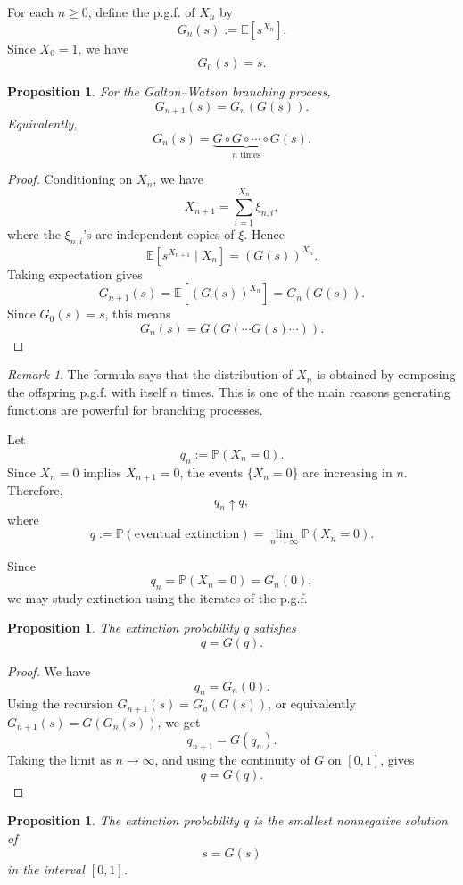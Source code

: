 \documentclass[11pt]{article}
\theoremstyle{plain}
\newtheorem{proposition}[theorem]{Proposition}
\theoremstyle{definition}
\theoremstyle{remark}
\newtheorem{remark}[theorem]{Remark}
\begin{document}
	For each \(n\ge 0\), define the p.g.f. of \(X_n\) by
	\[
	G_n(s)
	:=
	\mathbb{E}[s^{X_n}].
	\]
	Since \(X_0=1\), we have
	\[
	G_0(s)=s.
	\]
	
	\begin{proposition}
		For the Galton--Watson branching process,
		\[
		G_{n+1}(s)
		=
		G_n(G(s)).
		\]
		Equivalently,
		\[
		G_n(s)
		=
		\underbrace{G\circ G\circ\cdots\circ G}_{n\text{ times}}(s).
		\]
	\end{proposition}
	
	\begin{proof}
		Conditioning on \(X_n\), we have
		\[
		X_{n+1}
		=
		\sum_{i=1}^{X_n}\xi_{n,i},
		\]
		where the \(\xi_{n,i}\)'s are independent copies of \(\xi\). Hence
		\[
		\mathbb{E}[s^{X_{n+1}}\mid X_n]
		=
		(G(s))^{X_n}.
		\]
		Taking expectation gives
		\[
		G_{n+1}(s)
		=
		\mathbb{E}[(G(s))^{X_n}]
		=
		G_n(G(s)).
		\]
		Since \(G_0(s)=s\), this means
		\[
		G_n(s)
		=
		G(G(\cdots G(s)\cdots)).
		\]
	\end{proof}
	
	\begin{remark}
		The formula says that the distribution of \(X_n\) is obtained by composing the offspring p.g.f. with itself \(n\) times. This is one of the main reasons generating functions are powerful for branching processes.
	\end{remark}
	
	
	Let
	\[
	q_n:=\mathbb{P}(X_n=0).
	\]
	Since \(X_n=0\) implies \(X_{n+1}=0\), the events \(\{X_n=0\}\) are increasing in \(n\). Therefore,
	\[
	q_n\uparrow q,
	\]
	where
	\[
	q
	:=
	\mathbb{P}(\text{eventual extinction})
	=
	\lim_{n\to\infty}\mathbb{P}(X_n=0).
	\]
	
	Since
	\[
	q_n=\mathbb{P}(X_n=0)=G_n(0),
	\]
	we may study extinction using the iterates of the p.g.f.
	
	\begin{proposition}
		The extinction probability \(q\) satisfies
		\[
		q=G(q).
		\]
	\end{proposition}
	
	\begin{proof}
		We have
		\[
		q_n=G_n(0).
		\]
		Using the recursion \(G_{n+1}(s)=G_n(G(s))\), or equivalently \(G_{n+1}(s)=G(G_n(s))\), we get
		\[
		q_{n+1}
		=
		G(q_n).
		\]
		Taking the limit as \(n\to\infty\), and using the continuity of \(G\) on \([0,1]\), gives
		\[
		q
		=
		G(q).
		\]
	\end{proof}
	
	\begin{proposition}
		The extinction probability \(q\) is the smallest nonnegative solution of
		\[
		s=G(s)
		\]
		in the interval \([0,1]\).
	\end{proposition}
	
\end{document}
